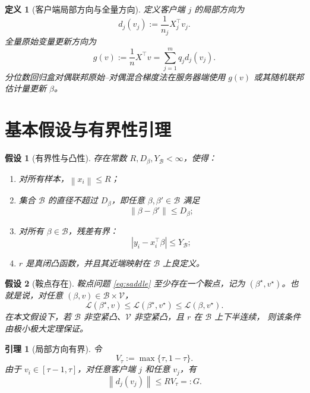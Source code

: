\documentclass[UTF8,a4paper,11pt]{ctexart}
\newtheorem{definition}{定义}
\newtheorem{assumption}{假设}
\newtheorem{lemma}{引理}
\newcommand{\V}{\mathcal{V}}
\newcommand{\B}{\mathcal{B}}
\newcommand{\norm}[1]{\left\|#1\right\|}
\begin{document}
\begin{definition}[客户端局部方向与全量方向]
定义客户端 $j$ 的局部方向为
\begin{equation}
    d_j(v_j)
    :=
    \frac{1}{n_j}X_j^\top v_j.
    \label{eq:local-direction}
\end{equation}
全量原始变量更新方向为
\begin{equation}
    g(v)
    :=
    \frac{1}{n}X^\top v
    =
    \sum_{j=1}^m q_j d_j(v_j).
    \label{eq:full-direction}
\end{equation}
分位数回归盒对偶联邦原始--对偶混合梯度法在服务器端使用 $g(v)$ 或其随机联邦估计量更新 $\beta$。
\end{definition}

\section{基本假设与有界性引理}

\begin{assumption}[有界性与凸性]
\label{assump:bounded}
存在常数 $R,D_\beta,Y_\B<\infty$，使得：
\begin{enumerate}[leftmargin=2em]
    \item 对所有样本，$\norm{x_i}\le R$；
    \item 集合 $\B$ 的直径不超过 $D_\beta$，即任意 $\beta,\beta'\in\B$ 满足
    \[
        \norm{\beta-\beta'}\le D_\beta;
    \]
    \item 对所有 $\beta\in\B$，残差有界：
    \[
        |y_i-x_i^\top\beta|\le Y_\B;
    \]
    \item $r$ 是真闭凸函数，并且其近端映射在 $\B$ 上良定义。
\end{enumerate}
\end{assumption}

\begin{assumption}[鞍点存在]
\label{assump:saddle}
鞍点问题 \eqref{eq:saddle} 至少存在一个鞍点，记为
$(\beta^\star,v^\star)$。也就是说，对任意 $(\beta,v)\in\B\times\V$，
\[
    \mathcal{L}(\beta^\star,v)
    \le
    \mathcal{L}(\beta^\star,v^\star)
    \le
    \mathcal{L}(\beta,v^\star).
\]
在本文假设下，若 $\B$ 非空紧凸、$\V$ 非空紧凸，且 $r$ 在 $\B$ 上下半连续，
则该条件由极小极大定理保证。
\end{assumption}

\begin{lemma}[局部方向有界]
\label{lem:direction-bound}
令
\[
    V_\tau:=\max\{\tau,1-\tau\}.
\]
由于 $v_i\in[\tau-1,\tau]$，对任意客户端 $j$ 和任意 $v_j$，有
\begin{equation}
    \norm{d_j(v_j)}
    \le
    R V_\tau
    =:G.
    \label{eq:G-bound}
\end{equation}
\end{lemma}
\end{document}
